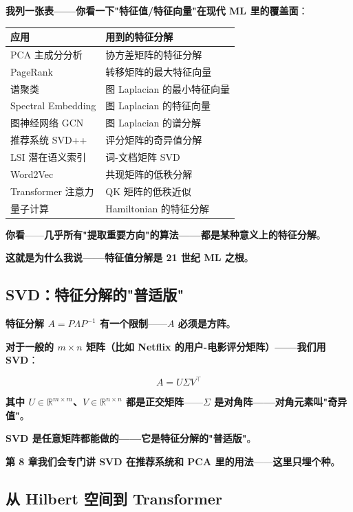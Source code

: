 \textbf{我列一张表——你看一下"特征值/特征向量"在现代 ML 里的覆盖面}：

\begin{center}
\begin{tabular}{|l|l|}
\hline
\textbf{应用} & \textbf{用到的特征分解} \\
\hline
PCA 主成分分析 & 协方差矩阵的特征分解 \\
PageRank & 转移矩阵的最大特征向量 \\
谱聚类 & 图 Laplacian 的最小特征向量 \\
Spectral Embedding & 图 Laplacian 的特征向量 \\
图神经网络 GCN & 图 Laplacian 的谱分解 \\
推荐系统 SVD++ & 评分矩阵的奇异值分解 \\
LSI 潜在语义索引 & 词-文档矩阵 SVD \\
Word2Vec & 共现矩阵的低秩分解 \\
Transformer 注意力 & QK 矩阵的低秩近似 \\
量子计算 & Hamiltonian 的特征分解 \\
\hline
\end{tabular}
\end{center}

\textbf{你看}——\textbf{几乎所有"提取重要方向"的算法——都是某种意义上的特征分解}。

\textbf{这就是为什么我说——\textbf{特征值分解是 21 世纪 ML 之根}}。

\subsection{SVD：特征分解的"普适版"}

\textbf{特征分解 $A = P\Lambda P^{-1}$ 有一个限制}——\textbf{$A$ 必须是方阵}。

\textbf{对于一般的 $m\times n$ 矩阵（比如 Netflix 的用户-电影评分矩阵）——我们用 SVD}：

\[
A = U \Sigma V^\top
\]

\textbf{其中 $U \in \mathbb{R}^{m\times m}$、$V \in \mathbb{R}^{n\times n}$ 都是正交矩阵}——\textbf{$\Sigma$ 是对角阵——对角元素叫"奇异值"}。

\textbf{SVD 是任意矩阵都能做的——它是特征分解的"普适版"}。

\textbf{第 8 章我们会专门讲 SVD 在推荐系统和 PCA 里的用法}——\textbf{这里只埋个种}。

\subsection{从 Hilbert 空间到 Transformer}

